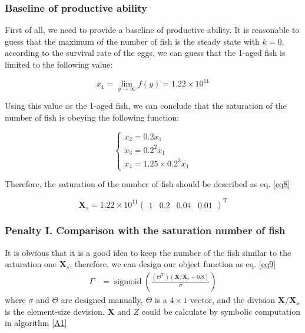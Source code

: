 \documentclass{IEEEtran}
\DeclareMathOperator*{\sigmoid}{sigmoid}
\begin{document}
\subsubsection{Baseline of productive ability}

First of all, we need to provide a baseline of productive ability. It is reasonable to guess that the maximum of the number of fish is the steady state with $k = 0$, according to the survival rate of the eggs, we can guess that the 1-aged fish is limited to the following value:

\begin{equation}
    x_1 = \lim_{y\to\infty} f(y) = 1.22 \times 10^{11}
\end{equation}

Using this value as the 1-aged fish, we can conclude that the saturation of the number of fish is obeying the following function:

\begin{equation}
    \begin{cases}
        x_2 = 0.2 x_1\\
        x_3 = 0.2^2 x_1\\
        x_4 = 1.25 \times 0.2^3 x_1
    \end{cases}
\end{equation}

Therefore, the saturation of the number of fish should be described as eq. \ref{eq8}

\begin{equation}
    \label{eq8}
    \bm X_s = 1.22 \times 10^{11}\begin{pmatrix}1 & 0.2 & 0.04 & 0.01\end{pmatrix}^\mathrm T
\end{equation}

\subsubsection{Penalty I. Comparison with the saturation number of fish}

It is obvious that it is a good idea to keep the number of the fish similar to the saturation one $\bm X_s$, therefore, we can design our object function as eq. \ref{eq9}
\begin{align}
    \label{eq9}
    \Gamma &= \sigmoid(\frac{(\Theta^\mathrm T)(\bm X / \bm X_s - 0.8)}{\sigma})
\end{align}
where $\sigma$ and $\Theta$ are designed manually, $\Theta$ is a $4 \times 1$ vector, and the division $\bm X / \bm X_s$ is the element-size devision. $\bm X$ and $Z$ could be calculate by symbolic computation in algorithm \ref{A1}
\end{document}

